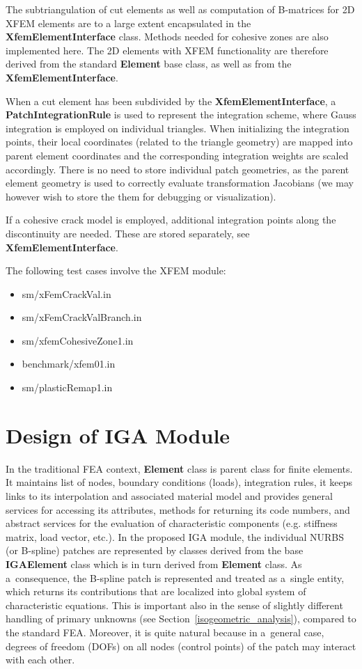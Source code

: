 \documentclass[a4paper]{article}
\newcommand{\class}[1]{{\bf #1}}
\begin{document}
The subtriangulation of cut elements as well as computation of B-matrices for
2D XFEM elements are to a large extent encapsulated in the
\class{XfemElementInterface} class. Methods needed for cohesive zones are also
implemented here. The 2D elements with XFEM functionality are therefore derived
from the standard \class{Element} base class, as well as from the
\class{XfemElementInterface}. 

When a cut element has been subdivided by the \class{XfemElementInterface},
a \class{PatchIntegrationRule} is used to represent the integration scheme,
where Gauss integration is employed on individual triangles. When
initializing the integration points, their local coordinates (related to the
triangle geometry) are mapped into parent element coordinates and the
corresponding integration weights are scaled accordingly. There is no need to
store individual patch geometries, as the parent element geometry is used to
correctly evaluate transformation Jacobians (we may however wish to store the
them for debugging or visualization). 

If a cohesive crack model is employed, additional integration points along
the discontinuity are needed. These are stored separately, see
\class{XfemElementInterface}. 

The following test cases involve the XFEM module:
\begin{itemize}
  \item sm/xFemCrackVal.in
  \item sm/xFemCrackValBranch.in
  \item sm/xfemCohesiveZone1.in
  \item benchmark/xfem01.in
  \item sm/plasticRemap1.in
\end{itemize}


\section{Design of IGA Module}
\label{iga_module}

In the traditional FEA context, \class{Element} class is parent
class for finite elements. It maintains list of nodes, boundary
conditions (loads), integration rules, it keeps links to its
interpolation and associated material model and provides general
services for accessing its attributes, methods for returning its code
numbers, and abstract services for the evaluation of characteristic
components (e.g. stiffness matrix, load vector, etc.). In the proposed
IGA module, the individual NURBS (or B-spline)
patches are represented by classes derived from the base
\class{IGAElement} class which is in turn derived from \class{Element}
class. As a~consequence, the B-spline patch is represented and treated as
a~single entity, which returns its contributions that are localized into
global system of characteristic equations. This is important also in the
sense of slightly different handling of primary unknowns (see
Section~\ref{isogeometric_analysis}), compared to the standard FEA.
Moreover, it is quite natural because in a~general case, degrees of
freedom (DOFs) on all nodes (control points) of the patch may interact
with each other.
\end{document}
